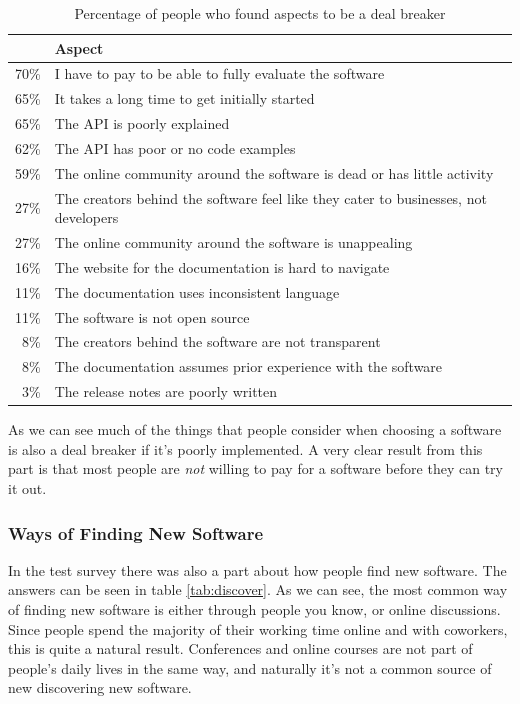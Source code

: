 \documentclass{article}
\begin{document}
\begin{table}[H]
\centering
\begin{tabularx}{\columnwidth}{r X}
& \textbf{Aspect}	\\ \hline
70\%	&	I have to pay to be able to fully evaluate the software	\\
65\%	&	It takes a long time to get initially started	\\
65\%	&	The API is poorly explained	\\
62\%	&	The API has poor or no code examples	\\
59\%	&	The online community around the software is dead or has little activity	\\
27\%	&	The creators behind the software feel like they cater to businesses, not developers	\\
27\%	&	The online community around the software is unappealing	\\
16\%	&	The website for the documentation is hard to navigate	\\
11\%	&	The documentation uses inconsistent language	\\
11\%	&	The software is not open source	\\
8\%	&	The creators behind the software are not transparent	\\
8\%	&	The documentation assumes prior experience with the software	\\
3\%	&	The release notes are poorly written	\\ \hline
\end{tabularx}
\caption{Percentage of people who found aspects to be a deal breaker}
\label{tab:dealbreaker}
\end{table}

As we can see much of the things that people consider when choosing a software is also a deal breaker if it's poorly implemented. A very clear result from this part is that most people are \textit{not} willing to pay for a software before they can try it out.

\subsubsection{Ways of Finding New Software}
In the test survey there was also a part about how people find new software. The answers can be seen in table \ref{tab:discover}. As we can see, the most common way of finding new software is either through people you know, or online discussions. Since people spend the majority of their working time online and with coworkers, this is quite a natural result. Conferences and online courses are not part of people's daily lives in the same way, and naturally it's not a common source of new discovering new software.
\end{document}
